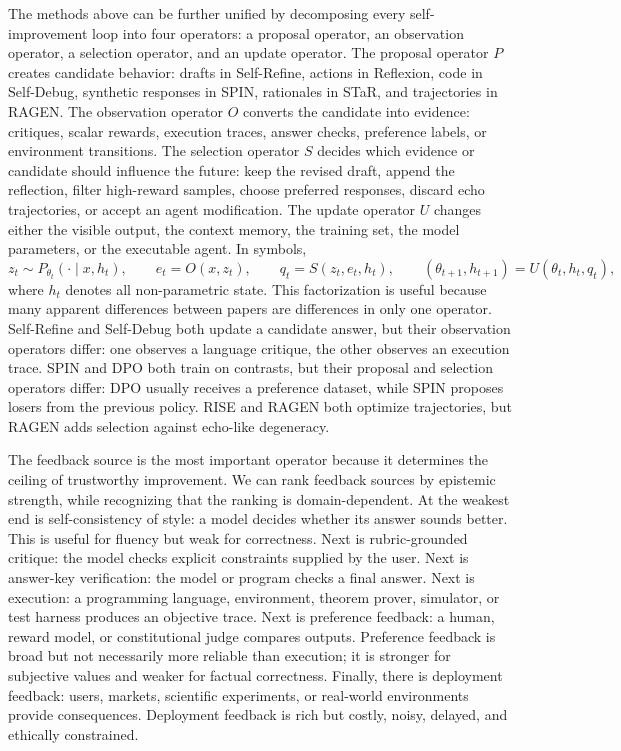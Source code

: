The methods above can be further unified by decomposing every self-improvement loop into four operators: a proposal operator, an observation operator, a selection operator, and an update operator. The proposal operator $P$ creates candidate behavior: drafts in Self-Refine, actions in Reflexion, code in Self-Debug, synthetic responses in SPIN, rationales in STaR, and trajectories in RAGEN. The observation operator $O$ converts the candidate into evidence: critiques, scalar rewards, execution traces, answer checks, preference labels, or environment transitions. The selection operator $S$ decides which evidence or candidate should influence the future: keep the revised draft, append the reflection, filter high-reward samples, choose preferred responses, discard echo trajectories, or accept an agent modification. The update operator $U$ changes either the visible output, the context memory, the training set, the model parameters, or the executable agent. In symbols,
\begin{equation}
    z_t \sim P_{\theta_t}(\cdot\mid x,h_t),\qquad
    e_t=O(x,z_t),\qquad
    q_t=S(z_t,e_t,h_t),\qquad
    (\theta_{t+1},h_{t+1})=U(\theta_t,h_t,q_t),
    \label{eq:posu}
\end{equation}
where $h_t$ denotes all non-parametric state. This factorization is useful because many apparent differences between papers are differences in only one operator. Self-Refine and Self-Debug both update a candidate answer, but their observation operators differ: one observes a language critique, the other observes an execution trace. SPIN and DPO both train on contrasts, but their proposal and selection operators differ: DPO usually receives a preference dataset, while SPIN proposes losers from the previous policy. RISE and RAGEN both optimize trajectories, but RAGEN adds selection against echo-like degeneracy.

The feedback source is the most important operator because it determines the ceiling of trustworthy improvement. We can rank feedback sources by epistemic strength, while recognizing that the ranking is domain-dependent. At the weakest end is self-consistency of style: a model decides whether its answer sounds better. This is useful for fluency but weak for correctness. Next is rubric-grounded critique: the model checks explicit constraints supplied by the user. Next is answer-key verification: the model or program checks a final answer. Next is execution: a programming language, environment, theorem prover, simulator, or test harness produces an objective trace. Next is preference feedback: a human, reward model, or constitutional judge compares outputs. Preference feedback is broad but not necessarily more reliable than execution; it is stronger for subjective values and weaker for factual correctness. Finally, there is deployment feedback: users, markets, scientific experiments, or real-world environments provide consequences. Deployment feedback is rich but costly, noisy, delayed, and ethically constrained.

